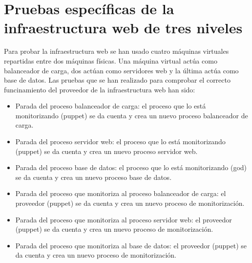 \section{Pruebas específicas de la infraestructura web de tres niveles}

Para probar la infraestructura web se han usado cuatro máquinas virtuales repartidas entre dos máquinas físicas. Una máquina virtual actúa como balanceador de carga, dos actúan como servidores web y la última actúa como base de datos. Las pruebas que se han realizado para comprobar el correcto funcinamiento del proveedor de la infraestructura web han sido:

\begin{itemize}
\item Parada del proceso balanceador de carga: el proceso que lo está monitorizando (puppet) se da cuenta y crea un nuevo proceso balanceador de carga.
\item Parada del proceso servidor web: el proceso que lo está monitorizando (puppet) se da cuenta y crea un nuevo proceso servidor web.
\item Parada del proceso base de datos: el proceso que lo está monitorizando (god) se da cuenta y crea un nuevo proceso base de datos.
\item Parada del proceso que monitoriza al proceso balanceador de carga: el proveedor (puppet) se da cuenta y crea un nuevo proceso de monitorización.
\item Parada del proceso que monitoriza al proceso servidor web: el proveedor (puppet) se da cuenta y crea un nuevo proceso de monitorización.
\item Parada del proceso que monitoriza al base de datos: el proveedor (puppet) se da cuenta y crea un nuevo proceso de monitorización.
\end{itemize}
